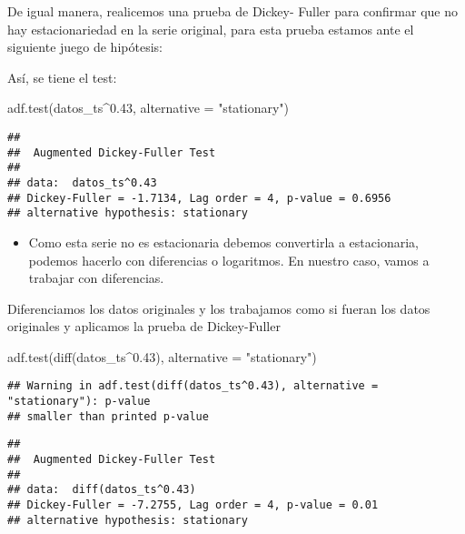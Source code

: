 \documentclass[
]{article}
\newenvironment{Shaded}{\begin{snugshade}}{\end{snugshade}}
\newcommand{\AttributeTok}[1]{\textcolor[rgb]{0.77,0.63,0.00}{#1}}
\newcommand{\FloatTok}[1]{\textcolor[rgb]{0.00,0.00,0.81}{#1}}
\newcommand{\FunctionTok}[1]{\textcolor[rgb]{0.00,0.00,0.00}{#1}}
\newcommand{\NormalTok}[1]{#1}
\newcommand{\SpecialCharTok}[1]{\textcolor[rgb]{0.00,0.00,0.00}{#1}}
\newcommand{\StringTok}[1]{\textcolor[rgb]{0.31,0.60,0.02}{#1}}
\providecommand{\tightlist}{%
  \setlength{\itemsep}{0pt}\setlength{\parskip}{0pt}}
\begin{document}
De igual manera, realicemos una prueba de Dickey- Fuller para confirmar
que no hay estacionariedad en la serie original, para esta prueba
estamos ante el siguiente juego de hipótesis:

Así, se tiene el test:

\begin{Shaded}
\begin{Highlighting}[]
\FunctionTok{adf.test}\NormalTok{(datos\_ts}\SpecialCharTok{\^{}}\FloatTok{0.43}\NormalTok{, }\AttributeTok{alternative =} \StringTok{"stationary"}\NormalTok{)}
\end{Highlighting}
\end{Shaded}

\begin{verbatim}
## 
##  Augmented Dickey-Fuller Test
## 
## data:  datos_ts^0.43
## Dickey-Fuller = -1.7134, Lag order = 4, p-value = 0.6956
## alternative hypothesis: stationary
\end{verbatim}

\begin{itemize}
\tightlist
\item
  Como esta serie no es estacionaria debemos convertirla a estacionaria,
  podemos hacerlo con diferencias o logaritmos. En nuestro caso, vamos a
  trabajar con diferencias.
\end{itemize}

Diferenciamos los datos originales y los trabajamos como si fueran los
datos originales y aplicamos la prueba de Dickey-Fuller

\begin{Shaded}
\begin{Highlighting}[]
\FunctionTok{adf.test}\NormalTok{(}\FunctionTok{diff}\NormalTok{(datos\_ts}\SpecialCharTok{\^{}}\FloatTok{0.43}\NormalTok{), }\AttributeTok{alternative =} \StringTok{"stationary"}\NormalTok{)}
\end{Highlighting}
\end{Shaded}

\begin{verbatim}
## Warning in adf.test(diff(datos_ts^0.43), alternative = "stationary"): p-value
## smaller than printed p-value
\end{verbatim}

\begin{verbatim}
## 
##  Augmented Dickey-Fuller Test
## 
## data:  diff(datos_ts^0.43)
## Dickey-Fuller = -7.2755, Lag order = 4, p-value = 0.01
## alternative hypothesis: stationary
\end{verbatim}
\end{document}
